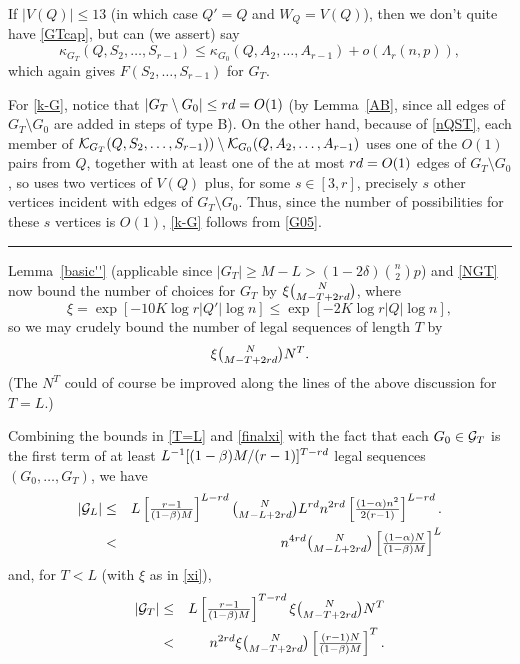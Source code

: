 \documentclass[letterpaper,11pt]{article}
\newcommand{\beq}[1]{\begin{equation}\label{#1}}
\newcommand{\enq}[0]{\end{equation}}
\newcommand{\sm}[0]{\setminus}
\renewcommand{\dots}[0]{,\ldots,}
\newcommand{\g}[0]{{\cal G}}
\newcommand{\K}[0]{{\cal K}}
\newcommand{\0}[0]{\emptyset}
\renewcommand{\qed}[0]{\begin{flushright} \rule{2mm}{3mm} \end{flushright}}
\newcommand{\C}[2]{{{#1}\choose{{#2}}}}
\newcommand{\Cc}[0]{\tbinom}
\newcommand{\ga}[0]{\alpha }
\newcommand{\gb}[0]{\beta }
\newcommand{\gd}[0]{\delta }
\newcommand{\gL}[0]{\Lambda}
\begin{document}
\medskip
If $|V(Q)|\leq 13$ (in which case $Q'=Q$ and $W_Q=V(Q)$),
then
we don't quite have \eqref{GTcap}, but can (we assert) say
\beq{k-G}
\kappa_{G_T}(Q,S_2\dots S_{r-1})
\leq \kappa_{G_0}(Q,A_2\dots A_{r-1})+ o(\gL_r(n,p)),
\enq
which again
gives $F(S_2\dots S_{r-1})$ for $G_T$.



For \eqref{k-G},
notice that $|G_T\sm G_0|\leq r\qq=O(1)$
(by Lemma~\ref{AB}, since all edges of $G_T\sm G_0$ are added
in steps of type B).
On the other hand, because of \eqref{nQST}, each
member of $\K_{G_T}(Q,S_2\dots S_{r-1}))
\sm \K_{G_0}(Q,A_2\dots A_{r-1})$
uses one of the $O(1)$ pairs
from $Q$, together with
at least one of the at most $rd= O(1)$
edges of $G_T\sm G_0$, so uses
two vertices of $V(Q)$ plus, for some $s\in [3,r]$,
precisely $s$ other vertices incident with edges of $G_T\sm G_0$.
Thus, since the number of possibilities for these $s$ vertices is $O(1)$,
\eqref{k-G} follows from \eqref{G05}.
\qed






Lemma~\ref{basic''}
(applicable since $|G_T|\geq M-L > (1-2\gd) \C{n}{2} p$)
%
%
and \eqref{NGT} now
bound the number of choices for
$G_T$ by $\xi\Cc{N}{M-T+2r\qq}$, where
\beq{xi}
\xi=\exp[-10K\log r|Q'|\log n]
\leq \exp[-2K\log r|Q|\log n],
\enq
so we may crudely bound the number of
legal sequences of length $T$
by
\beq{finalxi}
\xi \Cc{N}{M-T+2r\qq}N^{T}.
\enq
(The $N^{T}$
could of course be improved along the
lines of the above discussion
for $T=L$.)


\medskip
Combining the bounds in \eqref{T=L} and \eqref{finalxi} with the fact that
each $G_0\in \g_T$ is the first term of at least
$L^{-1}[(1-\gb)M/(r-1)]^{T-r\qq }$ legal sequences $(G_0\dots G_T)$,
we have
%
\begin{eqnarray}
|\g_L| &\leq&
L\left[\tfrac{r-1}{(1-\gb)M}\right]^{L-r\qq }
\Cc{N}{M-L+2r\qq}L^{r\qq}n^{2r\qq }
\left[\tfrac{(1-\ga )n^2}{2(r-1)}\right]^{L-r\qq }.\nonumber\\
&<&
n^{4r\qq }
\Cc{N}{M-L+2r\qq}
\left[\tfrac{(1-\ga)N}{(1-\gb)M}\right]^L\label{gL}
\end{eqnarray}
and, for $T<L$ (with $\xi$ as in \eqref{xi}),
\begin{eqnarray}
|\g_T| &\leq&
L\left[\tfrac{r-1}{(1-\gb)M}\right]^{T-r\qq }
\xi\Cc{N}{M-T+2r\qq}N^T
\nonumber\\
&<&
n^{2r\qq } \xi  \Cc{N}{M-T+2r\qq}
\left[\tfrac{(r-1)N}{(1-\gb)M}\right]^T\label{gT}.
\end{eqnarray}
\end{document}
